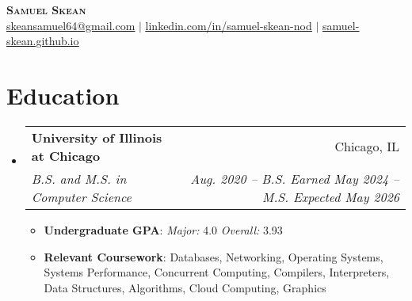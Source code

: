 \documentclass[letterpaper,11pt]{article}
\makeatletter
\newcommand{\resumeSubheading}[4]{
  \vspace{-2pt}\item
    \begin{tabular*}{0.97\textwidth}[t]{l@{\extracolsep{\fill}}r}
      \textbf{#1} & #2 \\
      \textit{\small#3} & \textit{\small #4} \\
    \end{tabular*}\vspace{-7pt}
}
\newcommand{\resumeSubHeadingListStart}{\begin{itemize}[leftmargin=0.15in, label={}]}
\newcommand{\resumeSubHeadingListEnd}{\end{itemize}}
\makeatother
\begin{document}

\begin{center}
    \textbf{\Huge \scshape Samuel Skean} \\ \vspace{1pt} \href{mailto:skeansamuel64@gmail.com}{\underline{skeansamuel64@gmail.com}} $|$ 
    \href{https://www.linkedin.com/in/samuel-skean-nod}{\underline{linkedin.com/in/samuel-skean-nod}} $|$ \href{https://samuel-skean.github.io}{\underline{samuel-skean.github.io}}
\end{center}


\section{Education}
  \resumeSubHeadingListStart
    \resumeSubheading
      {University of Illinois at Chicago}{Chicago, IL}
      {B.S. and M.S. in Computer Science}{Aug. 2020 -- B.S. Earned May 2024 -- M.S. Expected May 2026}
      \begin{itemize}
        \item \textbf{Undergraduate GPA}{: \emph{Major:} 4.0 \emph{Overall:} 3.93}
        \item \textbf{Relevant Coursework}: Databases, Networking, Operating Systems, Systems Performance, Concurrent Computing, Compilers, Interpreters, Data Structures, Algorithms, Cloud Computing, Graphics
      \end{itemize}
  \resumeSubHeadingListEnd
\end{document}
